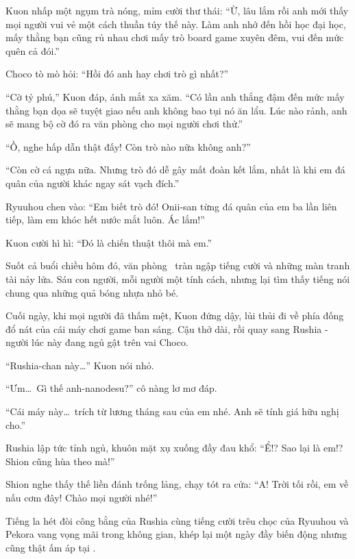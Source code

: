\documentclass[../main.tex]{subfiles}
\begin{document}
Kuon nhấp một ngụm trà nóng, mỉm cười thư thái: ``Ừ, lâu lắm rồi anh mới thấy mọi người vui vẻ một cách thuần túy thế này. Làm anh nhớ đến hồi học đại học, mấy thằng bạn cũng rủ nhau chơi mấy trò board game xuyên đêm, vui đến mức quên cả đói.''

Choco tò mò hỏi: ``Hồi đó anh hay chơi trò gì nhất?''

``Cờ tỷ phú,'' Kuon đáp, ánh mắt xa xăm. ``Có lần anh thắng đậm đến mức mấy thằng bạn dọa sẽ tuyệt giao nếu anh không bao tụi nó ăn lẩu. Lúc nào rảnh, anh sẽ mang bộ cờ đó ra văn phòng cho mọi người chơi thử.''

``Ồ, nghe hấp dẫn thật đấy! Còn trò nào nữa không anh?''

``Còn cờ cá ngựa nữa. Nhưng trò đó dễ gây mất đoàn kết lắm, nhất là khi em đá quân của người khác ngay sát vạch đích.''

Ryuuhou chen vào: ``Em biết trò đó! Onii-san từng đá quân của em ba lần liên tiếp, làm em khóc hết nước mắt luôn. Ác lắm!''

Kuon cười hì hì: ``Đó là chiến thuật thôi mà em.''

Suốt cả buổi chiều hôm đó, văn phòng \hll\ tràn ngập tiếng cười và những màn tranh tài nảy lửa. Sáu con người, mỗi người một tính cách, nhưng lại tìm thấy tiếng nói chung qua những quả bóng nhựa nhỏ bé.

Cuối ngày, khi mọi người đã thấm mệt, Kuon đứng dậy, lủi thủi đi về phía đống đổ nát của cái máy chơi game ban sáng. Cậu thở dài, rồi quay sang Rushia - người lúc này đang ngủ gật trên vai Choco.

``Rushia-chan này\dots'' Kuon nói nhỏ.

``Ưm\dots\ Gì thế anh-nanodesu?'' cô nàng lơ mơ đáp.

``Cái máy này\dots\ trích từ lương tháng sau của em nhé. Anh sẽ tính giá hữu nghị cho.''

Rushia lập tức tỉnh ngủ, khuôn mặt xụ xuống đầy đau khổ: ``Ể!? Sao lại là em!? Shion cũng hùa theo mà!''

Shion nghe thấy thế liền đánh trống lảng, chạy tót ra cửa: ``A! Trời tối rồi, em về nấu cơm đây! Chào mọi người nhé!''

Tiếng la hét đòi công bằng của Rushia cùng tiếng cười trêu chọc của Ryuuhou và Pekora vang vọng mãi trong không gian, khép lại một ngày đầy biến động nhưng cũng thật ấm áp tại \hll.
\end{document}
